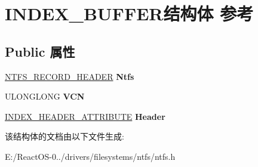 \hypertarget{struct_i_n_d_e_x___b_u_f_f_e_r}{}\section{I\+N\+D\+E\+X\+\_\+\+B\+U\+F\+F\+E\+R结构体 参考}
\label{struct_i_n_d_e_x___b_u_f_f_e_r}
\subsection*{Public 属性}
\begin{DoxyCompactItemize}
\item 
\mbox{\label{struct_i_n_d_e_x___b_u_f_f_e_r_ae6bd8a3dc7926ef4358b737d50c4d366}} 
\hyperlink{struct_n_t_f_s___r_e_c_o_r_d___h_e_a_d_e_r}{N\+T\+F\+S\+\_\+\+R\+E\+C\+O\+R\+D\+\_\+\+H\+E\+A\+D\+ER} {\bfseries Ntfs}
\item 
\mbox{\label{struct_i_n_d_e_x___b_u_f_f_e_r_ac8f271359103a6cf95db98ef98c98d15}} 
U\+L\+O\+N\+G\+L\+O\+NG {\bfseries V\+CN}
\item 
\mbox{\label{struct_i_n_d_e_x___b_u_f_f_e_r_a8c881b51b179a67dfa5279f4f903931b}} 
\hyperlink{struct_i_n_d_e_x___h_e_a_d_e_r___a_t_t_r_i_b_u_t_e}{I\+N\+D\+E\+X\+\_\+\+H\+E\+A\+D\+E\+R\+\_\+\+A\+T\+T\+R\+I\+B\+U\+TE} {\bfseries Header}
\end{DoxyCompactItemize}


该结构体的文档由以下文件生成\+:\begin{DoxyCompactItemize}
\item 
E\+:/\+React\+O\+S-\/0../drivers/filesystems/ntfs/ntfs.\+h\end{DoxyCompactItemize}
